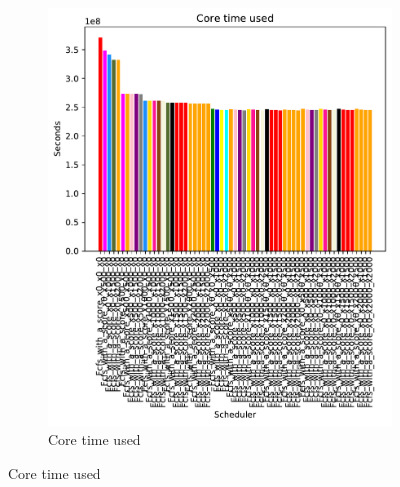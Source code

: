 \documentclass[a4paper]{article}
\begin{document}
\begin{figure}[H]
\begin{subfigure}[b]{0.4\linewidth}\centering\includegraphics[width=1\linewidth]{MBSS/plot/FCFS_Score_2022-01-24->2022-01-24_Core_time_used_450_128_32_256_4_1024.pdf}\caption{Core time used}\end{subfigure}

\end{figure}
\end{document}
